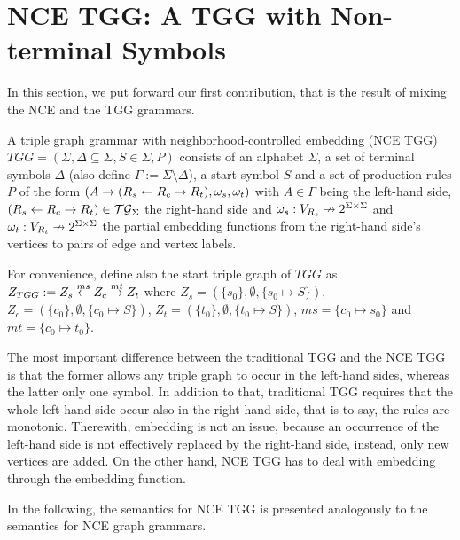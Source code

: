 \documentclass[runningheads]{llncs}
\begin{document}
\section{NCE TGG: A TGG with Non-terminal Symbols}
\label{sec:bncetgg}
In this section, we put forward our first contribution, that is the result of mixing the NCE and the TGG grammars.

\begin{definition}
	A triple graph grammar with neighborhood-controlled embedding (NCE TGG) $\mathit{TGG} = (\Sigma, \Delta \subseteq \Sigma, S \in \Sigma, P)$ consists of an alphabet $\Sigma$, a set of terminal symbols $\Delta$ (also define $\Gamma := \Sigma \setminus \Delta$), a start symbol $S$ and a set of production rules $P$ of the form $(A \to (R_s \overset{}{\leftarrow} R_c \overset{}{\rightarrow} R_t), \omega_s, \omega_t)$ with $A \in \Gamma$ being the left-hand side, $(R_s \overset{}{\leftarrow} R_c \overset{}{\rightarrow} R_t) \in \mathcal{TG}_{\Sigma}$ the right-hand side and $\omega_s : V_{R_s} \nrightarrow 2^{\Sigma \times \Sigma}$ and $\omega_t : V_{R_t} \nrightarrow 2^{\Sigma \times \Sigma}$ the partial embedding functions from the right-hand side's vertices to pairs of edge and vertex labels.
\end{definition}

For convenience, define also the start triple graph of $\mathit{TGG}$ as $Z_{TGG} := Z_s \overset{ms}{\leftarrow} Z_c \overset{mt}{\rightarrow} Z_t$ where $Z_s = (\{s_0\},\emptyset,\{s_0 \mapsto S\})$, $Z_c = (\{c_0\},\emptyset,\{c_0 \mapsto S\})$, $Z_t = (\{t_0\},\emptyset,\{t_0 \mapsto S\})$, $ms = \{c_0 \mapsto s_0 \}$ and $mt = \{c_0 \mapsto t_0 \}$.

The most important difference between the traditional TGG and the NCE TGG is that the former allows any triple graph to occur in the left-hand sides, whereas the latter only one symbol. In addition to that, traditional TGG requires that the whole left-hand side occur also in the right-hand side, that is to say, the rules are monotonic. Therewith, embedding is not an issue, because an occurrence of the left-hand side is not effectively replaced by the right-hand side, instead, only new vertices are added. On the other hand, NCE TGG has to deal with embedding through the embedding function.

In the following, the semantics for NCE TGG is presented analogously to the semantics for NCE graph grammars.
\end{document}
